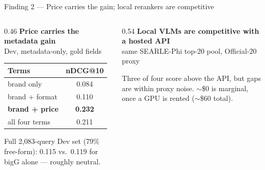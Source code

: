 \documentclass[aspectratio=169,10pt]{beamer}
\begin{document}
\begin{frame}{Finding 2 --- Price carries the gain; local rerankers are competitive}
\begin{columns}[T]
\begin{column}{0.46\textwidth}
\textbf{Price carries the metadata gain}\\
{\footnotesize Dev, metadata-only, gold fields}
\begin{center}\footnotesize
\begin{tabular}{@{}lc@{}}
\toprule
Terms & nDCG@10 \\ \midrule
brand only        & 0.084 \\
brand + format    & 0.110 \\
\textbf{brand + price} & \textbf{0.232} \\
all four terms    & 0.211 \\
\bottomrule
\end{tabular}
\end{center}
{\footnotesize Full 2{,}083-query Dev set (79\% free-form): 0.115 vs.\ 0.119 for bigG alone --- roughly neutral.}
\end{column}
\begin{column}{0.54\textwidth}
\textbf{Local VLMs are competitive with a hosted API}\\
{\footnotesize same SEARLE-Phi top-20 pool, Official-20 proxy}
\begin{center}\footnotesize
{}
\end{center}
{\footnotesize Three of four score above the API, but gaps are within proxy noise. $\sim$\$0 is marginal, once a GPU is rented ($\sim$\$60 total).}
\end{column}
\end{columns}
\end{frame}
\end{document}
